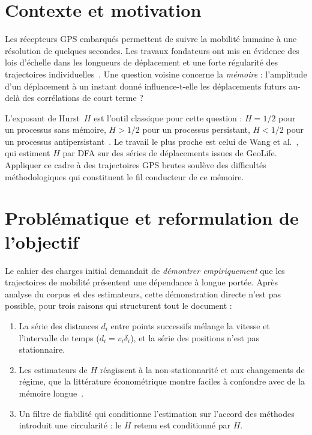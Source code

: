 \documentclass[12pt,a4paper]{report}
\theoremstyle{definition}
\begin{document}
\section{Contexte et motivation}

Les récepteurs GPS embarqués permettent de suivre la mobilité humaine à une résolution de
quelques secondes. Les travaux fondateurs ont mis en évidence des lois d'échelle dans les
longueurs de déplacement et une forte régularité des trajectoires
individuelles~\cite{brockmann2006,gonzalez2008,rhee2011}. Une question voisine concerne la
\emph{mémoire} : l'amplitude d'un déplacement à un instant donné influence-t-elle les
déplacements futurs au-delà des corrélations de court terme ?

L'exposant de Hurst~$H$ est l'outil classique pour cette question : $H=1/2$ pour un
processus sans mémoire, $H>1/2$ pour un processus persistant, $H<1/2$ pour un processus
antipersistant~\cite{mandelbrot1968}. Le travail le plus proche est celui de Wang et
al.~\cite{wang2013}, qui estiment $H$ par DFA sur des séries de déplacements issues de
GeoLife. Appliquer ce cadre à des trajectoires GPS brutes soulève des difficultés
méthodologiques qui constituent le fil conducteur de ce mémoire.

\section{Problématique et reformulation de l'objectif}

Le cahier des charges initial demandait de \emph{démontrer empiriquement} que les
trajectoires de mobilité présentent une dépendance à longue portée. Après analyse du
corpus et des estimateurs, cette démonstration directe n'est pas possible, pour trois
raisons qui structurent tout le document :

\begin{enumerate}
  \item La série des distances $d_i$ entre points successifs mélange la vitesse et
  l'intervalle de temps ($d_i = v_i \delta_i$), et la série des positions n'est pas
  stationnaire.
  \item Les estimateurs de $H$ réagissent à la non-stationnarité et aux changements de
  régime, que la littérature économétrique montre faciles à confondre avec de la mémoire
  longue~\cite{diebold2001}.
  \item Un filtre de fiabilité qui conditionne l'estimation sur l'accord des méthodes
  introduit une circularité : le $H$ retenu est conditionné par $H$.
\end{enumerate}
\end{document}
